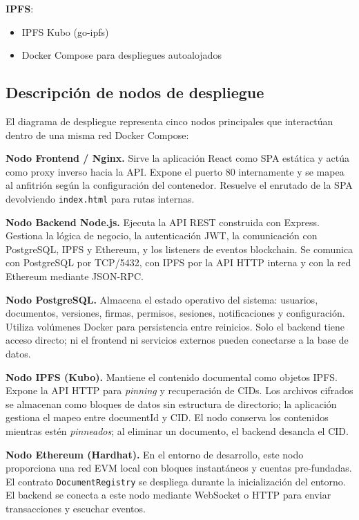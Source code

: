 \documentclass[11pt, a4paper]{article}
\begin{document}
\textbf{IPFS}:
\begin{itemize}
    \item IPFS Kubo (go-ipfs)
    \item Docker Compose para despliegues autoalojados
\end{itemize}

\subsection{Descripci\'on de nodos de despliegue}

El diagrama de despliegue representa cinco nodos principales que interact\'uan dentro de una misma red Docker Compose:

\textbf{Nodo Frontend / Nginx.} Sirve la aplicaci\'on React como SPA est\'atica y act\'ua como proxy inverso hacia la API. Expone el puerto 80 internamente y se mapea al anfitri\'on seg\'un la configuraci\'on del contenedor. Resuelve el enrutado de la SPA devolviendo \texttt{index.html} para rutas internas.

\textbf{Nodo Backend Node.js.} Ejecuta la API REST construida con Express. Gestiona la l\'ogica de negocio, la autenticaci\'on JWT, la comunicaci\'on con PostgreSQL, IPFS y Ethereum, y los listeners de eventos blockchain. Se comunica con PostgreSQL por TCP/5432, con IPFS por la API HTTP interna y con la red Ethereum mediante JSON-RPC.

\textbf{Nodo PostgreSQL.} Almacena el estado operativo del sistema: usuarios, documentos, versiones, firmas, permisos, sesiones, notificaciones y configuraci\'on. Utiliza vol\'umenes Docker para persistencia entre reinicios. Solo el backend tiene acceso directo; ni el frontend ni servicios externos pueden conectarse a la base de datos.

\textbf{Nodo IPFS (Kubo).} Mantiene el contenido documental como objetos IPFS. Expone la API HTTP para \textit{pinning} y recuperaci\'on de CIDs. Los archivos cifrados se almacenan como bloques de datos sin estructura de directorio; la aplicaci\'on gestiona el mapeo entre documentId y CID. El nodo conserva los contenidos mientras est\'en \textit{pinneados}; al eliminar un documento, el backend desancla el CID.

\textbf{Nodo Ethereum (Hardhat).} En el entorno de desarrollo, este nodo proporciona una red EVM local con bloques instant\'aneos y cuentas pre-fundadas. El contrato \texttt{DocumentRegistry} se despliega durante la inicializaci\'on del entorno. El backend se conecta a este nodo mediante WebSocket o HTTP para enviar transacciones y escuchar eventos.
\end{document}
